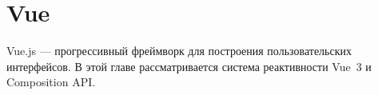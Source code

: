 \chapter{Vue}

Vue.js — прогрессивный фреймворк для построения пользовательских
интерфейсов.  В этой главе рассматривается система реактивности Vue~3
и Composition API.


